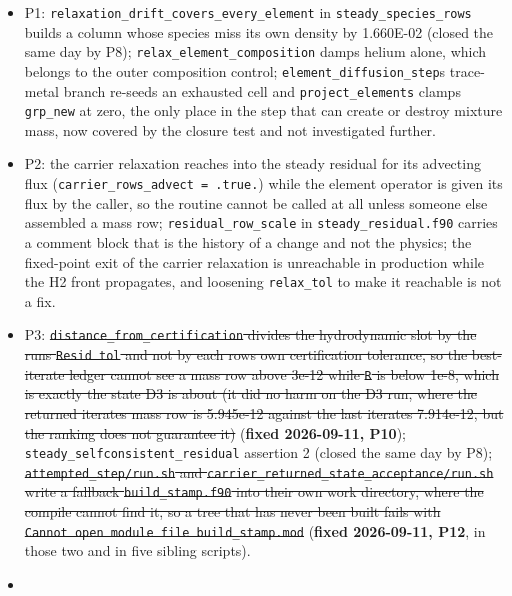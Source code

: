 \documentclass[english,a4paper]{my_memo}
\providecommand{\tightlist}{\setlength{\itemsep}{0pt}\setlength{\parskip}{0pt}}
\begin{document}
\begin{itemize}
\tightlist
\item
  P1: \texttt{relaxation\_drift\_covers\_every\_element} in \texttt{steady\_species\_rows}
  builds a column whose species miss its own density by 1.660E-02 (closed
  the same day by P8); \texttt{relax\_element\_composition} damps helium alone, which
  belongs to the outer composition control; \texttt{element\_diffusion\_step}\textquotesingle s
  trace-metal branch re-seeds an exhausted cell and \texttt{project\_elements} clamps
  \texttt{grp\_new} at zero, the only place in the step that can create or destroy
  mixture mass, now covered by the closure test and not investigated
  further.
\item
  P2: the carrier relaxation reaches into the steady residual for its
  advecting flux (\texttt{carrier\_rows\_advect\ =\ .true.}) while the element operator
  is given its flux by the caller, so the routine cannot be called at all
  unless someone else assembled a mass row; \texttt{residual\_row\_scale} in
  \texttt{steady\_residual.f90} carries a comment block that is the history of a
  change and not the physics; the fixed-point exit of the carrier relaxation
  is unreachable in production while the H2 front propagates, and loosening
  \texttt{relax\_tol} to make it reachable is not a fix.
\item
  P3: \st{\mbox{\texttt{distance\_from\_certification}} divides the hydrodynamic slot by the
  run\textquotesingle s \mbox{\texttt{Resid\ tol}} and not by each row\textquotesingle s own certification tolerance, so
  the best-iterate ledger cannot see a mass row above 3e-12 while \mbox{\texttt{\textbar{}\textbar{}R\textbar{}\textbar{}}} is
  below 1e-8, which is exactly the state D3 is about (it did no harm on the
  D3 run, where the returned iterate\textquotesingle s mass row is 5.945e-12 against the
  last iterate\textquotesingle s 7.914e-12, but the ranking does not guarantee it)}
  (\textbf{fixed 2026-09-11, P10});
  \texttt{steady\_selfconsistent\_residual} assertion 2 (closed the same day by P8);
  \st{\mbox{\texttt{attempted\_step/run.sh}} and \mbox{\texttt{carrier\_returned\_state\_acceptance/run.sh}}
  write a fallback \mbox{\texttt{build\_stamp.f90}} into their own work directory, where
  the compile cannot find it, so a tree that has never been built fails with
  \mbox{\texttt{Cannot\ open\ module\ file\ \textquotesingle{}build\_stamp.mod\textquotesingle{}}}} (\textbf{fixed 2026-09-11, P12},
  in those two and in five sibling scripts).
\item

\end{itemize}
\end{document}
